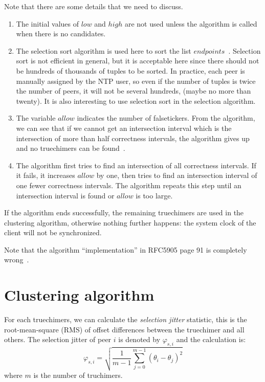 Note that there are some details that we need to discuss. 
\begin{enumerate}
    \item 
        The initial values of $low$ and $high$ are not used unless the
        algorithm is called when there is no candidates.
    \item 
        The selection sort algorithm is used here to sort the list
        $endpoints$~\cite{source_code}. Selection sort is not efficient in
        general, but
        it is acceptable here since there should not be hundreds of thousands
        of tuples to be sorted. In practice, each peer is manually assigned by
        the NTP user, so even if the number of tuples is twice the
        number of peers, it will not be several hundreds, (maybe no more than
        twenty). It is also interesting to use selection sort in the selection
        algorithm.
    \item
        The variable $allow$ indicates the number of falsetickers. From the
        algorithm, we can see that if we cannot get an intersection interval
        which is the intersection of more than half correctness intervals,
        the algorithm gives up and no truechimers can be
        found~\cite{clock_selection}.
    \item
        The algorithm first tries to find an intersection of all correctness
        intervals. If it fails, it increases $allow$ by one, then tries to find
        an intersection interval of one fewer correctness intervals. The
        algorithm
        repeats this step until an intersection interval is found or $allow$
        is too large.
\end{enumerate}
If the algorithm ends successfully, the remaining truechimers are used in the
clustering algorithm, otherwise nothing further happens: the system clock of
the client will not be synchronized.

Note that the algorithm ``implementation'' in RFC5905 page 91 is completely
wrong~\cite{rfc5905}.


\section{Clustering algorithm}%
\label{sec:clustering_algorithm}
For each truechimers, we can calculate the \emph{selection jitter} statistic,
this is the root-mean-square (RMS) of offset differences between the truechimer
and all others. The selection jitter of peer $i$ is denoted by $\varphi_{s,i}$
and the calculation is:
\begin{equation}
    \varphi_{s,i} = \sqrt{\frac{1}{m-1} \sum^{m-1}_{j=0} (\theta_i -
    \theta_j)^2 }
    \label{eq:selection_jitter}
\end{equation}
where $m$ is the number of truchimers.

